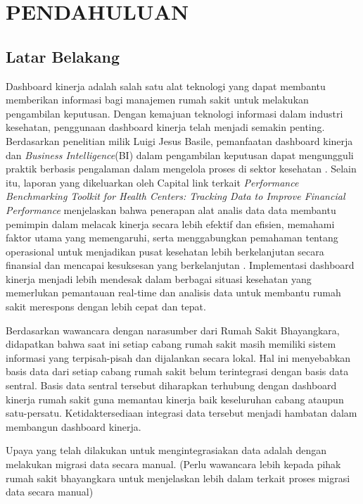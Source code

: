 \chapter{PENDAHULUAN}

\section{Latar Belakang}

Dashboard kinerja adalah salah satu alat teknologi yang dapat membantu memberikan informasi bagi manajemen rumah sakit untuk
melakukan pengambilan keputusan. Dengan kemajuan teknologi informasi dalam industri kesehatan, penggunaan dashboard kinerja telah menjadi semakin penting.
Berdasarkan penelitian milik Luigi Jesus Basile, pemanfaatan dashboard kinerja dan \emph{Business Intelligence}(BI) dalam pengambilan keputusan dapat mengungguli praktik berbasis pengalaman 
dalam mengelola proses di sektor kesehatan \parencite{Basile2023}. Selain itu, laporan yang dikeluarkan oleh Capital link terkait \emph{Performance Benchmarking Toolkit for Health Centers: Tracking Data to Improve Financial Performance } 
menjelaskan bahwa penerapan alat analis data data membantu pemimpin dalam melacak kinerja secara lebih efektif dan efisien, 
memahami faktor utama yang memengaruhi, serta menggabungkan pemahaman tentang operasional untuk menjadikan 
pusat kesehatan lebih berkelanjutan secara finansial dan mencapai kesuksesan yang berkelanjutan \parencite{CapitalLink2017}. 
Implementasi dashboard kinerja menjadi lebih mendesak dalam berbagai situasi kesehatan yang memerlukan pemantauan 
real-time dan analisis data untuk membantu rumah sakit merespons dengan lebih cepat dan tepat.

Berdasarkan wawancara dengan narasumber dari Rumah Sakit Bhayangkara, didapatkan bahwa saat ini setiap cabang rumah sakit masih memiliki 
sistem informasi yang terpisah-pisah dan dijalankan secara lokal. Hal ini menyebabkan basis data dari setiap cabang rumah sakit belum terintegrasi dengan basis data sentral. 
Basis data sentral tersebut diharapkan terhubung dengan dashboard kinerja rumah sakit guna memantau kinerja baik keseluruhan cabang ataupun satu-persatu.
Ketidaktersediaan integrasi data tersebut menjadi hambatan dalam membangun dashboard kinerja.

Upaya yang telah dilakukan untuk mengintegrasiakan data adalah dengan melakukan migrasi data secara manual. 
(Perlu wawancara lebih kepada pihak rumah sakit bhayangkara untuk menjelaskan lebih dalam terkait proses 
migrasi data secara manual)

